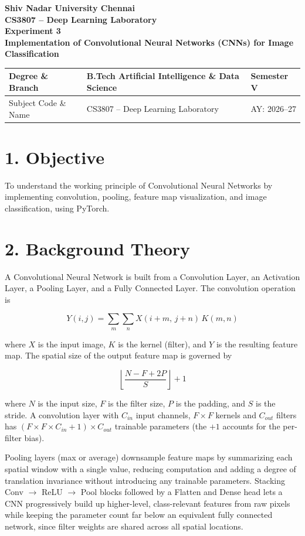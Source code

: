 \documentclass[11pt]{article}
\begin{document}
\begin{center}
{\Large\textbf{Shiv Nadar University Chennai}}\\
\textbf{CS3807 -- Deep Learning Laboratory}\\
\textbf{Experiment 3}\\
{\large\textbf{Implementation of Convolutional Neural Networks (CNNs) for Image Classification}}
\end{center}

\renewcommand{\arraystretch}{1.25}

\begin{tabular}{|p{3.8cm}|p{8cm}|p{2cm}|}
\hline
Degree \& Branch & B.Tech Artificial Intelligence \& Data Science & Semester V\\ \hline
Subject Code \& Name & CS3807 -- Deep Learning Laboratory & AY: 2026--27\\ \hline
\end{tabular}

\section*{1. Objective}
To understand the working principle of Convolutional Neural Networks by implementing convolution, pooling, feature map visualization, and image classification, using PyTorch.

\section*{2. Background Theory}
A Convolutional Neural Network is built from a Convolution Layer, an Activation Layer, a Pooling Layer, and a Fully Connected Layer. The convolution operation is

\[
Y(i,j)=\sum_{m}\sum_{n}X(i+m,\,j+n)\,K(m,n)
\]

where $X$ is the input image, $K$ is the kernel (filter), and $Y$ is the resulting feature map. The spatial size of the output feature map is governed by

\[
\left\lfloor\frac{N-F+2P}{S}\right\rfloor+1
\]

where $N$ is the input size, $F$ is the filter size, $P$ is the padding, and $S$ is the stride. A convolution layer with $C_{in}$ input channels, $F\times F$ kernels and $C_{out}$ filters has $(F\times F\times C_{in}+1)\times C_{out}$ trainable parameters (the $+1$ accounts for the per-filter bias).

Pooling layers (max or average) downsample feature maps by summarizing each spatial window with a single value, reducing computation and adding a degree of translation invariance without introducing any trainable parameters. Stacking Conv $\rightarrow$ ReLU $\rightarrow$ Pool blocks followed by a Flatten and Dense head lets a CNN progressively build up higher-level, class-relevant features from raw pixels while keeping the parameter count far below an equivalent fully connected network, since filter weights are shared across all spatial locations.
\end{document}
